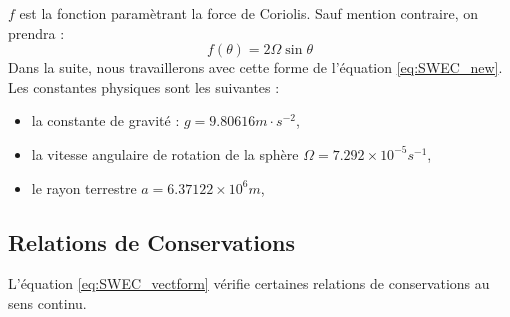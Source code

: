 $f$ est la fonction paramètrant la force de Coriolis. Sauf mention contraire, on prendra :
\begin{equation}
f(\theta) = 2 \Omega \sin \theta
\end{equation}
Dans la suite, nous travaillerons avec cette forme de l'équation \eqref{eq:SWEC_new}. Les constantes physiques sont les suivantes :
\begin{itemize}
\item la constante de gravité : $g=9.80616 m \cdot \si{s^{-2}}$,
\item la vitesse angulaire de rotation de la sphère $\Omega=7.292 \times 10^{-5} \si{s^{-1}}$,
\item le rayon terrestre $a=6.37122 \times 10^6 \si{m}$,
\end{itemize}













\subsection{Relations de Conservations}

L'équation \eqref{eq:SWEC_vectform} vérifie certaines relations de conservations au sens continu.

